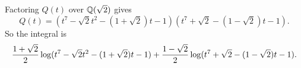 Factoring $Q(t)$ over $\mathbb{Q}(\sqrt{2})$ gives
\[
Q(t) = (t^7 - \sqrt{2} t^2 - (1 + \sqrt{2}) t - 1)
(t^7 + \sqrt{2} - (1 - \sqrt{2}) t -1).
\]
So the integral is
\[
{1 + \sqrt{2} \over 2} \log (t^7 - \sqrt{2} t^2 - (1 + \sqrt{2}) t - 1)
+ {1 - \sqrt{2} \over 2} \log (t^7 + \sqrt{2} - (1 - \sqrt{2}) t -1).
\]

